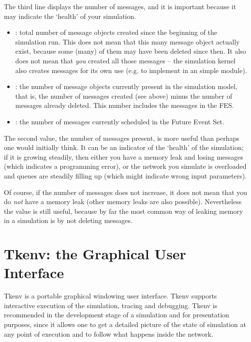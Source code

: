 The third line displays the number of messages, and it is important
because it may indicate the `health' of your simulation.

\begin{itemize}
   \item{: total number of message objects created since the
     beginning of the simulation run. This does not mean that this many message
     object actually exist, because some (many) of them may have been deleted
     since then. It also does not mean that \textit{you} created all those
     messages -- the simulation kernel also creates messages for its own use
     (e.g. to implement  in an  simple module).}
   \item{: the number of message objects currently present
     in the simulation model, that is, the number of messages created (see above)
     minus the number of messages already deleted. This number includes
     the messages in the FES.}
   \item{: the number of messages currently scheduled in the
     Future Event Set.}
\end{itemize}


The second value, the number of messages present, is more useful than
perhaps one would initially think. It can be an indicator of the `health' of the simulation;
if it is growing steadily, then either you have a memory leak and losing
messages (which indicates a programming error), or the network you simulate is
overloaded and queues are steadily filling up (which might indicate wrong input
parameters).

Of course, if the number of messages does not increase, it does not mean
that you do \textit{not} have a memory leak (other memory leaks are also
possible). Nevertheless the value is still useful, because by far the
most common way of leaking memory in a simulation is by not deleting messages.



\section{Tkenv: the Graphical User Interface}

Tkenv is a portable graphical windowing user interface.
Tkenv supports interactive execution of the simulation, tracing and
debugging. Tkenv is recommended in the
development stage of a simulation and for presentation purposes,
since it allows one to get a detailed picture of the state
of simulation at any point of execution and to follow what happens
inside the network.

